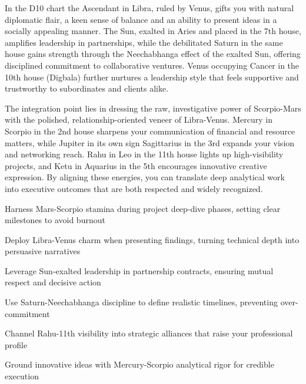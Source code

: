 {\fontsize{9}{13}\selectfont In the D10 chart the Ascendant in Libra, ruled by Venus, gifts you with natural diplomatic flair, a keen sense of balance and an ability to present ideas in a socially appealing manner. The Sun, exalted in Aries and placed in the 7th house, amplifies leadership in partnerships, while the debilitated Saturn in the same house gains strength through the Neechabhanga effect of the exalted Sun, offering disciplined commitment to collaborative ventures. Venus occupying Cancer in the 10th house (Digbala) further nurtures a leadership style that feels supportive and trustworthy to subordinates and clients alike.}\par\vspace{1.8mm}

{\fontsize{9}{13}\selectfont The integration point lies in dressing the raw, investigative power of Scorpio-Mars with the polished, relationship-oriented veneer of Libra-Venus. Mercury in Scorpio in the 2nd house sharpens your communication of financial and resource matters, while Jupiter in its own sign Sagittarius in the 3rd expands your vision and networking reach. Rahu in Leo in the 11th house lights up high-visibility projects, and Ketu in Aquarius in the 5th encourages innovative creative expression. By aligning these energies, you can translate deep analytical work into executive outcomes that are both respected and widely recognized.}\par\vspace{1.8mm}

\begin{diamondlist}
  \item {\fontsize{8.5}{12}\selectfont Harness Mars-Scorpio stamina during project deep-dive phases, setting clear milestones to avoid burnout}
  \item {\fontsize{8.5}{12}\selectfont Deploy Libra-Venus charm when presenting findings, turning technical depth into persuasive narratives}
  \item {\fontsize{8.5}{12}\selectfont Leverage Sun-exalted leadership in partnership contracts, ensuring mutual respect and decisive action}
  \item {\fontsize{8.5}{12}\selectfont Use Saturn-Neechabhanga discipline to define realistic timelines, preventing over-commitment}
  \item {\fontsize{8.5}{12}\selectfont Channel Rahu-11th visibility into strategic alliances that raise your professional profile}
  \item {\fontsize{8.5}{12}\selectfont Ground innovative ideas with Mercury-Scorpio analytical rigor for credible execution}
\end{diamondlist}


